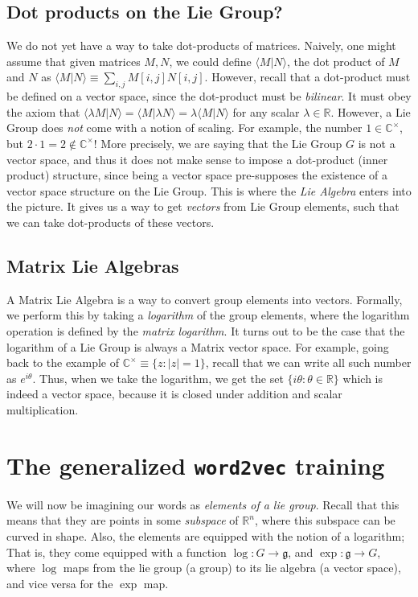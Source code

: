 \documentclass[11pt]{book}
\newcommand{\C}{\ensuremath{\mathbb{C}}}
\newcommand{\R}{\ensuremath{\mathbb R}}
\begin{document}
\subsection{Dot products on the Lie Group?}
We do not yet have a way to take dot-products of matrices. Naively, one might assume that given matrices
$M, N$, we could define $\langle M | N \rangle$, the dot product of $M$ and $N$ as
$\langle M | N \rangle \equiv \sum_{i, j} M[i, j] N[i, j]$. However, recall
that a dot-product must be defined on a vector space, since the dot-product must be \emph{bilinear}. It must
obey the axiom that $\langle \lambda M | N \rangle = \langle M | \lambda N \rangle = \lambda \langle M | N \rangle$
for any scalar $\lambda \in \R$. However, a Lie Group does \emph{not} come with a notion of scaling.
For example, the number $1 \in \mathbb C^\times$, but $2 \cdot 1 = 2 \not \in \mathbb C^\times$! More precisely,
we are saying that the Lie Group $G$ is not a vector space, and thus it does not make sense to impose a dot-product (inner product)
structure, since being a vector space pre-supposes the existence of a vector space structure on the Lie Group.
This is where the \emph{Lie Algebra} enters into the picture. It gives us a way to get \emph{vectors} from 
Lie Group elements, such that we can take dot-products of these vectors.


\subsection{Matrix Lie Algebras}
A Matrix Lie Algebra is a way to convert group elements into vectors. Formally,
we perform this by taking a \emph{logarithm} of the group elements, where the
logarithm operation is defined by the \emph{matrix logarithm}.  It turns out to
be the case that the logarithm of a Lie Group is always a Matrix vector space.
For example, going back to the example of $\C^\times \equiv \{ z : |z| = 1 \}$,
recall that we can write all such number as $e^{i \theta}$. Thus, when we take the logarithm,
we get the set  $\{ i \theta : \theta \in \mathbb R \}$ which is indeed a vector space,
because it is closed under addition and scalar multiplication.

\section{The generalized \texttt{word2vec} training}
We will now be imagining our words as \emph{elements of a lie group}. Recall that this means that
they are points in some \emph{subspace} of $\mathbb R^n$, where this subspace can be curved in shape.
Also, the elements are equipped with the notion of a logarithm; That is, they come equipped with a
function $\log : G \rightarrow \mathfrak g$, and $\exp: \mathfrak g \rightarrow G$,
where $\log$ maps from the lie group (a group) to its lie algebra (a vector space),
and vice versa for the $\exp$ map.
\end{document}
